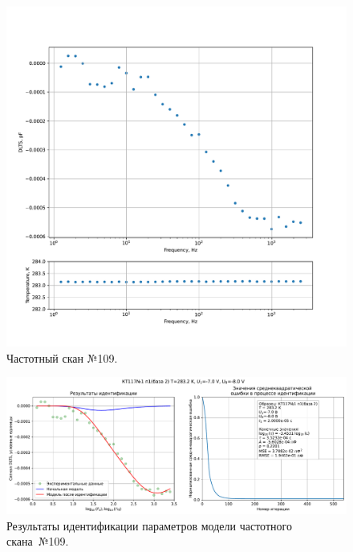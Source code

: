 \begin{figure}[!ht]
    \centering
    \includegraphics[width=1\textwidth]{../plots/КТ117№1_п1(база 2)_2500Гц-1Гц_1пФ_+10С_-7В-8В_10мВ_20мкс_шаг_0,1.pdf}
    \caption{Частотный скан №109.}
    \label{pic:frequency_scan_109}
\end{figure}

\begin{figure}[!ht]
    \centering
    \includegraphics[width=1\textwidth]{../plots/КТ117№1_п1(база 2)_2500Гц-1Гц_1пФ_+10С_-7В-8В_10мВ_20мкс_шаг_0,1_model.pdf}
    \caption{Результаты идентификации параметров модели частотного скана~№109.}
    \label{pic:frequency_scan_model109}
\end{figure}

\pagebreak


